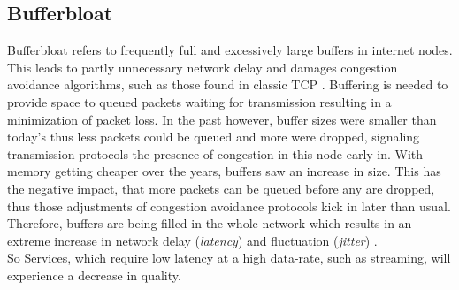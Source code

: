 \documentclass[a4paper,conference]{IEEEtran}
\begin{document}
\subsection*{Bufferbloat}
Bufferbloat refers to frequently full and excessively large buffers in internet nodes. This leads to partly unnecessary network delay and damages congestion avoidance algorithms, such as those found in classic TCP \cite{gettys2012bufferbloat,chen2014bufferbloat}. Buffering is needed to provide space to queued packets waiting for transmission resulting in a minimization of packet loss. In the past however, buffer sizes were smaller than today's thus less packets could be queued and more were dropped, signaling transmission protocols the presence of congestion in this node early in. With memory getting cheaper over the years, buffers saw an increase in size. This has the negative impact, that more packets can be queued before any are dropped, thus those adjustments of congestion avoidance protocols kick in later than usual. Therefore, buffers are being filled in the whole network which results in an extreme increase in network delay (\textit{latency}) and fluctuation (\textit{jitter}) \cite{gettys2012bufferbloat,staff2012bufferbloat,chen2014bufferbloat}.
\\So Services, which require low latency at a high data-rate, such as streaming, will experience a decrease in quality.
\end{document}
